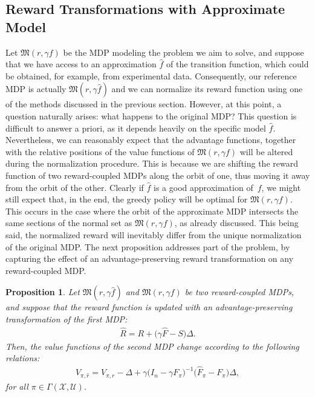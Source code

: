 \documentclass[10pt,leqno]{amsart}
\newcommand{\U}{\mathcal{U}}
\newcommand{\X}{\mathcal{X}}
\newcommand{\cost}{r}
\newcommand{\Vsym}{V}
\newcommand{\Varg}[1]{\Vsym_{#1}}
\newcommand{\Cost}{R}
\newcommand{\f}{f}
\newcommand{\F}{F}
\newcommand{\Ffb}[1]{\F_{#1}}
\newcommand{\Fapx}{\hat{F}}
\newcommand{\Fapxfb}[1]{\Fapx_{#1}}
\newcommand{\policy}{\pi}
\newcommand{\Sect}{\Gamma(\X, \U)}
\newcommand{\disc}{\gamma}
\newcommand{\Proj}{S}
\newcommand{\mdp}{\mathfrak{M}}
\newcommand{\mdparg}[2]{\mdp\left(#1, #2\right)}
\newcommand{\Costpert}{\hat{\Cost}}
\newtheorem{proposition}[theorem]{Proposition}
\begin{document}
\subsection{Reward Transformations with Approximate Model}
\label{subsec:section_3A}
Let $\mdparg{\cost}{\disc \f}$ be the MDP modeling the problem we aim to solve, and suppose that we have access to an approximation $\hat{\f}$ of the transition function, which could be obtained, for example, from experimental data. Consequently, our reference MDP is actually $\mdparg{\cost}{\disc \hat{\f}}$ and we can normalize its reward function using one of the methods discussed in the previous section. However, at this point, a question naturally arises: what happens to the original MDP? This question is difficult to answer a priori, as it depends heavily on the specific model $\hat{\f}$. Nevertheless, we can reasonably expect that the advantage functions, together with the relative positions of the value functions of $\mdparg{\cost}{\disc \f}$ will be altered during the normalization procedure. This is because we are shifting the reward function of two reward-coupled MDPs along the orbit of one, thus moving it away from the orbit of the other. Clearly if $\hat{\f}$ is a good approximation of~$\f$, we might still expect that, in the end, the greedy policy will be optimal for $\mdparg{\cost}{\disc \f}$. This occurs in the case where the orbit of the approximate MDP intersects the same sections of the normal set as $\mdparg{\cost}{\disc \f}$, as already discussed. This being said, the normalized reward will inevitably differ from the unique normalization of the original MDP. The next proposition addresses part of the problem, by capturing the effect of an advantage-preserving reward transformation on any reward-coupled MDP.
\begin{proposition}\label{prop:modified_transformation}
    Let $\mdparg{\cost}{\disc \hat{\f}}$ and $\mdparg{\cost}{\disc \f}$ be two reward-coupled MDPs, and suppose that the reward function is updated with an advantage-preserving transformation of the first MDP:
    \begin{align*}
        \Costpert = \Cost + \bigl( \disc \Fapx - \Proj \bigr) \Delta.
    \end{align*}
    Then, the value functions of the second MDP change according to the following relations:
    \begin{align}\label{eq:modified_transform}
        \Varg{\policy, \hat{\cost}} = \Varg{\policy, \cost} - \Delta + \disc \bigl(I_n - \disc \Ffb{\policy}\bigr)^{-1} \bigl(\Fapxfb{\policy} - \Ffb{\policy} \bigr) \Delta,
    \end{align}
    for all $\policy \in \Sect$.
\end{proposition}
\end{document}
